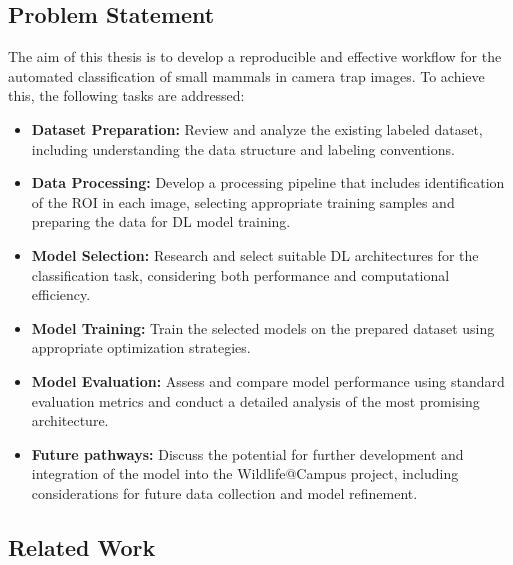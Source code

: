\subsection{Problem Statement}

The aim of this thesis is to develop a reproducible and effective workflow for the automated classification of small mammals in camera trap images. To achieve this, the following tasks are addressed:

\begin{itemize}
    \item \textbf{Dataset Preparation:} Review and analyze the existing labeled dataset, including understanding the data structure and labeling conventions.
    
    \item \textbf{Data Processing:} Develop a processing pipeline that includes identification of the \ac{ROI} in each image, selecting appropriate training samples and preparing the data for \ac{DL} model training.
    
    \item \textbf{Model Selection:} Research and select suitable \ac{DL} architectures for the classification task, considering both performance and computational efficiency.
    
    \item \textbf{Model Training:} Train the selected models on the prepared dataset using appropriate optimization strategies.
    
    \item \textbf{Model Evaluation:} Assess and compare model performance using standard evaluation metrics and conduct a detailed analysis of the most promising architecture.

    \item \textbf{Future pathways:} Discuss the potential for further development and integration of the model into the Wildlife@Campus project, including considerations for future data collection and model refinement.
\end{itemize}

\subsection{Related Work}

